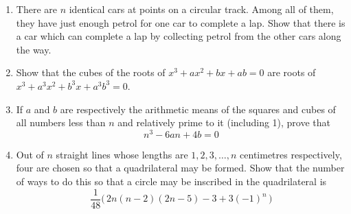 \documentclass{article}
\begin{document}
\begin{enumerate}
  \item
  There are $n$ identical cars at points on a circular track. 
  Among all of them, they have just enough petrol for one car to complete a lap. 
  Show that there is a car which can complete a lap by collecting petrol from the other cars along the way.

  \item
  Show that the cubes of the roots of $x^3 + a x^2 + b x + ab = 0$
  are roots of $x^3 + a^3 x^2 + b^3 x + a^3 b^3 = 0$.

  \item
  If $a$ and $b$ are respectively the arithmetic means of the  squares and cubes of all numbers less than $n$ and relatively prime to it (including 1), prove that
  \[ n^3 - 6 a n + 4 b = 0 \]

  \item
  Out of $n$ straight lines whose lengths are $1,2,3,\ldots, n$ centimetres respectively, four are chosen so that a quadrilateral may be formed.
  Show that the number of ways to do this so that a circle may be inscribed in the quadrilateral is
  \[ \frac1{48} \big(\, 2n(n-2)(2n-5) - 3 + 3(-1)^n \,\big) \]
\end{enumerate}
\end{document}
